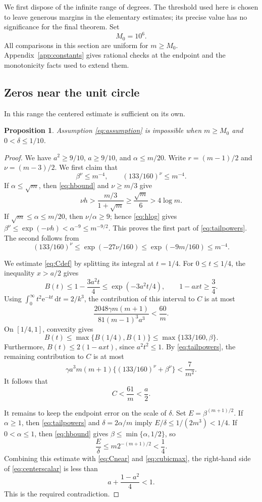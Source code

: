 \documentclass[11pt,letterpaper,reqno]{amsart}
\newtheorem{prop}[thm]{Proposition}
\theoremstyle{definition}
\numberwithin{equation}{section}
\newcommand{\dd}{\,\mathrm d}
\newcommand{\e}{\mathrm e}
\begin{document}
We first dispose of the infinite range of degrees. The threshold used here is chosen to leave generous margins in the elementary estimates; its precise value has no significance for the final theorem. Set
\[
 M_0=10^6.
\]
All comparisons in this section are uniform for $m\ge M_0$. Appendix~\ref{app:constants} gives rational checks at the endpoint and the monotonicity facts used to extend them.

\subsection{Zeros near the unit circle}
In this range the centered estimate is sufficient on its own.

\begin{prop}\label{prop:near}
Assumption \eqref{eq:assumption} is impossible when $m\ge M_0$ and $0<\delta\le1/10$.
\end{prop}

\begin{proof}
We have $a^2\ge9/10$, $a\ge9/10$, and $\alpha\le m/20$. Write
$r=(m-1)/2$ and $\nu=(m-3)/2$. We first claim that
\begin{equation}\label{eq:tailpowers}
 \beta^\nu\le m^{-4},\qquad
 (133/160)^\nu\le m^{-4}.
\end{equation}
If $\alpha\le\sqrt m$, then \eqref{eq:hbound} and $\nu\ge m/3$ give
\[
 \nu h>\frac{m/3}{1+\sqrt m}\ge\frac{\sqrt m}{6}>4\log m.
\]
If $\sqrt m\le\alpha\le m/20$, then $\nu/\alpha\ge9$; hence \eqref{eq:hlog} gives
$\beta^\nu\le\exp(-\nu h)<\alpha^{-9}\le m^{-9/2}$.
This proves the first part of \eqref{eq:tailpowers}. The second follows from
\[
 (133/160)^\nu\le\exp(-27\nu/160)
 \le\exp(-9m/160)\le m^{-4}.
\]

We estimate \eqref{eq:Cdef} by splitting its integral at $t=1/4$. For $0\le t\le1/4$, the inequality $x>a/2$ gives
\[
 B(t)\le1-\frac{3a^2t}{4}\le\exp(-3a^2t/4),
 \qquad 1-axt\ge\frac34.
\]
Using $\int_0^\infty t^2\e^{-kt}\dd t=2/k^3$, the contribution of this interval to $C$ is at most
\[
 \frac{2048\gamma m(m+1)}{81(m-1)^3a^3}<\frac{60}{m}.
\]
On $[1/4,1]$, convexity gives
\[
 B(t)\le\max\{B(1/4),B(1)\}
       \le\max\{133/160,\beta\}.
\]
Furthermore, $B(t)\le2(1-axt)$, since $a^2t^2\le1$. By \eqref{eq:tailpowers}, the remaining contribution to $C$ is at most
\[
 \gamma a^3m(m+1)\bigl\{(133/160)^\nu+\beta^\nu\bigr\}
 <\frac7{m^2}.
\]
It follows that
\begin{equation}\label{eq:Cnear}
 C<\frac{61}{m}<\frac a2.
\end{equation}

It remains to keep the endpoint error on the scale of $\delta$. Set $E=\beta^{(m+1)/2}$. If $\alpha\ge1$, then \eqref{eq:tailpowers} and $\delta=2\alpha/m$ imply
$E/\delta\le1/(2m^3)<1/4$. If $0<\alpha\le1$, then \eqref{eq:hbound} gives $\beta\le\min\{\alpha,1/2\}$, so
\[
 \frac E\delta\le m2^{-(m+1)/2}<\frac14.
\]
Combining this estimate with \eqref{eq:Cnear} and \eqref{eq:cubicmax}, the right-hand side of \eqref{eq:centerscalar} is less than
\[
 a+\frac{1-a^2}{4}<1.
\]
This is the required contradiction.
\end{proof}
\end{document}
